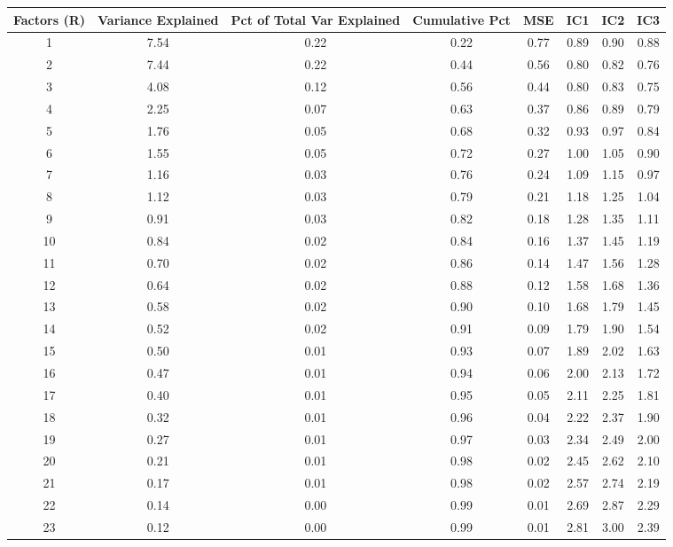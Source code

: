 \documentclass[11pt, letterpaper]{article}\usepackage[]{graphicx}\usepackage[]{color}
\begin{document}
\begin{table}[H]
\centering
\begingroup\scriptsize
\begin{tabular}{cccccccc}
  \hline
Factors (R) & Variance Explained & Pct of Total Var Explained & Cumulative Pct & MSE & IC1 & IC2 & IC3 \\ 
  \hline
  1 & 7.54 & 0.22 & 0.22 & 0.77 & 0.89 & 0.90 & 0.88 \\ 
    2 & 7.44 & 0.22 & 0.44 & 0.56 & 0.80 & 0.82 & 0.76 \\ 
    3 & 4.08 & 0.12 & 0.56 & 0.44 & 0.80 & 0.83 & 0.75 \\ 
    4 & 2.25 & 0.07 & 0.63 & 0.37 & 0.86 & 0.89 & 0.79 \\ 
    5 & 1.76 & 0.05 & 0.68 & 0.32 & 0.93 & 0.97 & 0.84 \\ 
    6 & 1.55 & 0.05 & 0.72 & 0.27 & 1.00 & 1.05 & 0.90 \\ 
    7 & 1.16 & 0.03 & 0.76 & 0.24 & 1.09 & 1.15 & 0.97 \\ 
    8 & 1.12 & 0.03 & 0.79 & 0.21 & 1.18 & 1.25 & 1.04 \\ 
    9 & 0.91 & 0.03 & 0.82 & 0.18 & 1.28 & 1.35 & 1.11 \\ 
   10 & 0.84 & 0.02 & 0.84 & 0.16 & 1.37 & 1.45 & 1.19 \\ 
   11 & 0.70 & 0.02 & 0.86 & 0.14 & 1.47 & 1.56 & 1.28 \\ 
   12 & 0.64 & 0.02 & 0.88 & 0.12 & 1.58 & 1.68 & 1.36 \\ 
   13 & 0.58 & 0.02 & 0.90 & 0.10 & 1.68 & 1.79 & 1.45 \\ 
   14 & 0.52 & 0.02 & 0.91 & 0.09 & 1.79 & 1.90 & 1.54 \\ 
   15 & 0.50 & 0.01 & 0.93 & 0.07 & 1.89 & 2.02 & 1.63 \\ 
   16 & 0.47 & 0.01 & 0.94 & 0.06 & 2.00 & 2.13 & 1.72 \\ 
   17 & 0.40 & 0.01 & 0.95 & 0.05 & 2.11 & 2.25 & 1.81 \\ 
   18 & 0.32 & 0.01 & 0.96 & 0.04 & 2.22 & 2.37 & 1.90 \\ 
   19 & 0.27 & 0.01 & 0.97 & 0.03 & 2.34 & 2.49 & 2.00 \\ 
   20 & 0.21 & 0.01 & 0.98 & 0.02 & 2.45 & 2.62 & 2.10 \\ 
   21 & 0.17 & 0.01 & 0.98 & 0.02 & 2.57 & 2.74 & 2.19 \\ 
   22 & 0.14 & 0.00 & 0.99 & 0.01 & 2.69 & 2.87 & 2.29 \\ 
   23 & 0.12 & 0.00 & 0.99 & 0.01 & 2.81 & 3.00 & 2.39 \\ 

\end{tabular}
\end{table}
\end{document}
